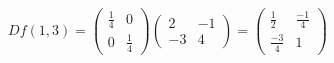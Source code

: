 \documentclass[a4paper, 12pt]{article}
\begin{document}
\begin{solucio}
        \begin{displaymath}
            Df(1,3)
            =
            \begin{pmatrix}
                \frac{1}{4} & 0\\
                0 & \frac{1}{4}
            \end{pmatrix}
            \begin{pmatrix}
                2 & -1\\
                -3 & 4
            \end{pmatrix}
            = 
            \begin{pmatrix}
                \frac{1}{2} & \frac{-1}{4}\\
                \frac{-3}{4} & 1
            \end{pmatrix}
        \end{displaymath}
    \end{solucio}
\end{document}
